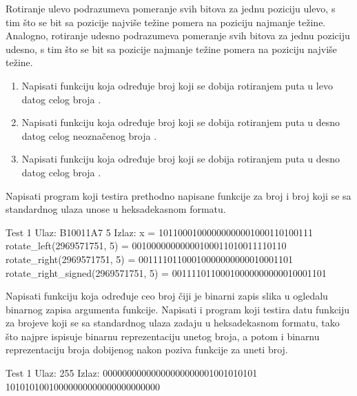 \begin{Exercise}[label=205]
Rotiranje ulevo podrazumeva pomeranje svih bitova za jednu poziciju ulevo, s tim što se bit sa pozicije najviše težine pomera na poziciju najmanje težine. Analogno, rotiranje udesno podrazumeva pomeranje svih bitova za jednu poziciju udesno, s tim što se bit sa pozicije najmanje težine pomera na poziciju najviše težine.
\begin{enumerate}
\item Napisati funkciju  koja određuje broj koji se dobija rotiranjem  puta u levo datog celog broja . 
\item Napisati funkciju  koja određuje broj koji se dobija rotiranjem  puta u desno datog celog neoznačenog broja . 
\item Napisati funkciju  koja određuje broj koji se dobija rotiranjem  puta u desno datog celog broja . 
\end{enumerate}
Napisati program koji testira prethodno napisane funkcije za broj  i broj  koji se sa standardnog ulaza unose u heksadekasnom formatu.

\begin{maxitest}
\begin{test}{Test 1}
Ulaz:   B10011A7 5   
Izlaz:  
  x                                      = 10110001000000000001000110100111
  rotate_left(2969571751,     5)         = 00100000000000100011010011110110
  rotate_right(2969571751,     5)        = 00111101100010000000000010001101
  rotate_right_signed(2969571751,     5) = 00111101100010000000000010001101
\end{test}
\end{maxitest}

\end{Exercise}
\begin{Answer}[ref=205]
\end{Answer}

\begin{Exercise}[label=206]
Napisati funkciju  koja određuje ceo broj čiji je binarni zapis slika u ogledalu binarnog zapisa argumenta funkcije. Napisati i program koji testira datu funkciju za brojeve koji se sa standardnog ulaza zadaju u heksadekasnom formatu, tako što najpre ispisuje binarnu reprezentaciju unetog broja, a potom i binarnu reprezentaciju broja dobijenog nakon poziva funkcije  za uneti broj.

\begin{maxitest}
\begin{test}{Test 1}
Ulaz:  255   
Izlaz:  
  00000000000000000000001001010101
  10101010010000000000000000000000
\end{test}
\end{maxitest}

\end{Exercise}
\begin{Answer}[ref=206]
\end{Answer}

